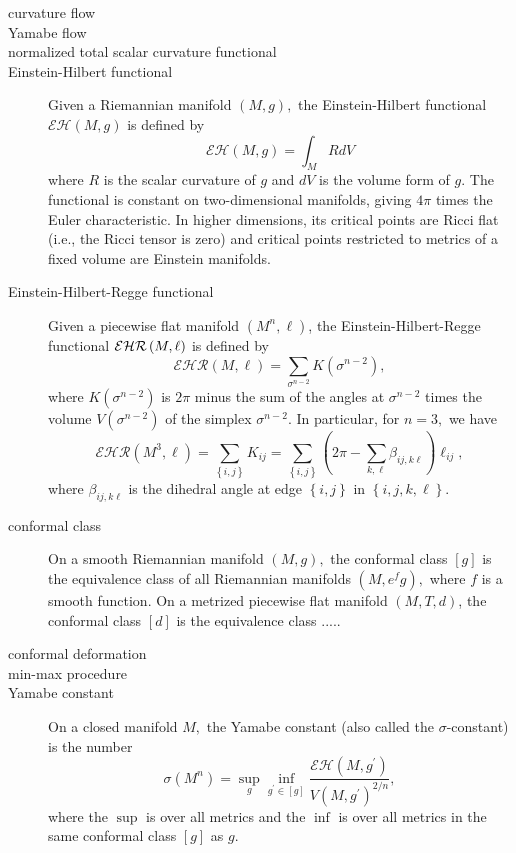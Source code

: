 \begin{description}
\item[curvature flow] 

\item[Yamabe flow] 

\item[normalized total scalar curvature functional] 

\item[Einstein-Hilbert functional] Given a Riemannian manifold $\left(
M,g\right) ,$ the Einstein-Hilbert functional $\mathcal{EH}\left( M,g\right) 
$ is defined by 
\[
\mathcal{EH}\left( M,g\right) =\int_{M}RdV
\]%
where $R$ is the scalar curvature of $g$ and $dV$ is the volume form of $g.$
The functional is constant on two-dimensional manifolds, giving $4\pi $
times the Euler characteristic. In higher dimensions, its critical points
are Ricci flat (i.e., the Ricci tensor is zero) and critical points
restricted to metrics of a fixed volume are Einstein manifolds.

\item[Einstein-Hilbert-Regge functional] Given a piecewise flat manifold $%
\left( M^{n},\ell \right) $, the Einstein-Hilbert-Regge functional $\mathcal{%
EHR}\left( M,\ell \right) $ is defined by 
\[
\mathcal{EHR}\left( M,\ell \right) =\sum_{\sigma ^{n-2}}K\left( \sigma
^{n-2}\right) ,
\]%
where $K\left( \sigma ^{n-2}\right) $ is $2\pi $ minus the sum of the angles
at $\sigma ^{n-2}$ times the volume $V\left( \sigma ^{n-2}\right) $ of the
simplex $\sigma ^{n-2}.$ In particular, for $n=3,$ we have 
\[
\mathcal{EHR}\left( M^{3},\ell \right) =\sum_{\left\{ i,j\right\}
}K_{ij}=\sum_{\left\{ i,j\right\} }\left( 2\pi -\sum_{k,\ell }\beta
_{ij,k\ell }\right) \ell _{ij},
\]%
where $\beta _{ij,k\ell }$ is the dihedral angle at edge $\left\{
i,j\right\} $ in $\left\{ i,j,k,\ell \right\} .$

\item[conformal class] On a smooth Riemannian manifold $\left( M,g\right) ,$
the conformal class $\left[ g\right] $ is the equivalence class of all
Riemannian manifolds $\left( M,e^{f}g\right) ,$ where $f$ is a smooth
function. On a metrized piecewise flat manifold $\left( M,T,d\right) $, the
conformal class $\left[ d\right] $ is the equivalence class .....

\item[conformal deformation] 

\item[min-max procedure] 

\item[Yamabe constant] On a closed manifold $M,$ the Yamabe constant (also
called the $\sigma $-constant) is the number 
\[
\sigma \left( M^{n}\right) =\sup_{g}\inf_{g^{\prime }\in \left[ g\right] }%
\frac{\mathcal{EH}\left( M,g^{\prime }\right) }{V\left( M,g^{\prime }\right)
^{2/n}},
\]%
where the $\sup $ is over all metrics and the $\inf $ is over all metrics in
the same conformal class $\left[ g\right] $ as $g.$


\end{description}
